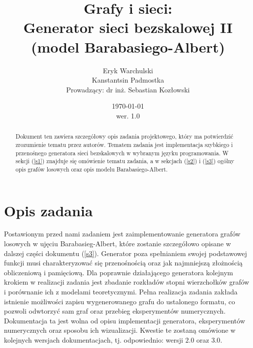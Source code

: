 \documentclass{article}
\title{Grafy i sieci: \\ Generator sieci bezskalowej II (model Barabasiego-Albert)}
\author{Eryk Warchulski \\ Kanstantsin Padmostka \\ Prowadzący: dr inż. Sebastian Kozłowski}%
\date{\today\\wer. 1.0}
\begin{document}
\maketitle
{\footnotesize{\tableofcontents}}
\vspace{2cm}
\begin{abstract}
	Dokument ten zawiera szczegółowy opis zadania projektowego, który ma potwierdzić zrozumienie tematu przez autorów.
	Tematem zadania jest implementacja szybkiego i przenośnego generatora
	sieci bezskalowych w wybranym języku programowania. 
	W sekcji (\ref{s1}) znajduje się omówienie tematu zadania, a w sekcjach (\ref{s2}) i  
	(\ref{s3}) ogólny opis grafów losowych oraz opis modelu Barabasiego-Albert. 
\end{abstract}
\newpage
\section{Opis zadania \label{s1}}
	Postawionym przed nami zadaniem jest zaimplementowanie generatora grafów losowych w ujęciu Barabasieg-Albert, które zostanie szczegółowo
	opisane w dalszej części dokumentu (\ref{s3}). Generator poza spełnianiem swojej podstawowej funkcji musi charakteryzować się
	przenośnością oraz jak najmniejszą złożnością obliczeniową i pamięciową. Dla poprawnie działającego generatora kolejnym krokiem w realizacji
	zadania jest zbadanie rozkładów stopni wierzchołków grafów i porównanie ich z modelami teoretycznymi. Pełna realizacja zadania zakłada istnienie
	możliwości zapisu wygenerowanego grafu do ustalonego formatu, co pozwoli odwtorzyć sam graf oraz przebieg eksperymentów numerycznych.\\
	Dokumentacja ta jest wolna od opisu implementacji generatora, eksperymentów numerycznych oraz sposobu ich wizualizacji. Kwestie te zostaną
	omówione w kolejnych wersjach dokumentacjach, tj. odpowiednio: wersji $2.0$ oraz $3.0$. 
\end{document}
